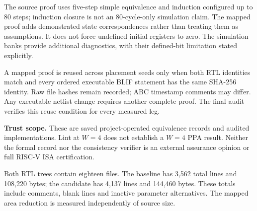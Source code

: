 The source proof uses five-step simple equivalence and induction configured up to 80 steps; induction closure is not an 80-cycle-only simulation claim. The mapped proof adds demonstrated state correspondences rather than treating them as assumptions. It does not force undefined initial registers to zero. The simulation banks provide additional diagnostics, with their defined-bit limitation stated explicitly.

A mapped proof is reused across placement seeds only when both RTL identities match and every ordered executable BLIF statement has the same SHA-256 identity. Raw file hashes remain recorded; ABC timestamp comments may differ. Any executable netlist change requires another complete proof. The final audit verifies this reuse condition for every measured leg.

\begin{scopebox}\textbf{Trust scope.} These are saved project-operated equivalence records and audited implementations. Lint at $W=4$ does not establish a $W=4$ PPA result. Neither the formal record nor the consistency verifier is an external assurance opinion or full RISC-V ISA certification.\end{scopebox}

Both RTL trees contain eighteen files. The baseline has 3,562 total lines and 108,220 bytes; the candidate has 4,137 lines and 144,460 bytes. These totals include comments, blank lines and inactive parameter alternatives. The mapped area reduction is measured independently of source size.

